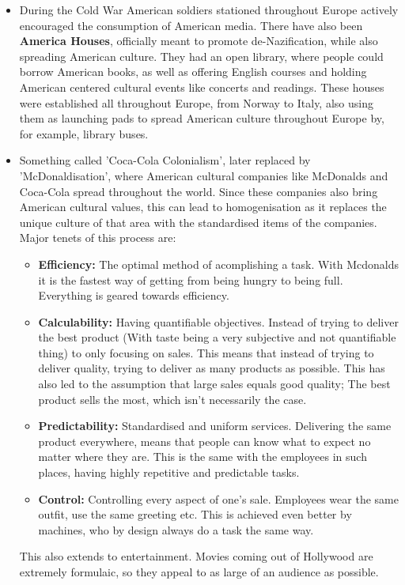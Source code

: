\documentclass{article}
\begin{document}
	\begin{itemize}
		\item{During the Cold War American soldiers stationed throughout Europe actively encouraged the consumption of American media. There have also been \textbf{America Houses}, officially meant to promote de-Nazification, while also spreading American culture. They had an open library, where people could borrow American books, as well as offering English courses and holding American centered cultural events like concerts and readings. These houses were established all throughout Europe, from Norway to Italy, also using them as launching pads to spread American culture throughout Europe by, for example, library buses.}
		\item{Something called 'Coca-Cola Colonialism', later replaced by 'McDonaldisation', where American cultural companies like McDonalds and Coca-Cola spread throughout the world. Since these companies also bring American cultural values, this can lead to homogenisation as it replaces the unique culture of that area with the standardised items of the companies. Major tenets of this process are:
		\begin{itemize}
			\item{\textbf{Efficiency:} The optimal method of acomplishing a task. With Mcdonalds it is the fastest way of getting from being hungry to being full. Everything is geared towards efficiency.}
			\item{\textbf{Calculability:} Having quantifiable objectives. Instead of trying to deliver the best product (With taste being a very subjective and not quantifiable thing) to only focusing on sales. This means that instead of trying to deliver quality, trying to deliver as many products as possible. This has also led to the assumption that large sales equals good quality; The best product sells the most, which isn't necessarily the case.}
		 	\item{\textbf{Predictability:} Standardised and uniform services. Delivering the same product everywhere, means that people can know what to expect no matter where they are. This is the same with the employees in such places, having highly repetitive and predictable tasks.}
		 	\item{\textbf{Control:} Controlling every aspect of one's sale. Employees wear the same outfit, use the same greeting etc. This is achieved even better by machines, who by design always do a task the same way.}
		 \end{itemize}}	
		 This also extends to entertainment. Movies coming out of Hollywood are extremely formulaic, so they appeal to as large of an audience as possible.
	\end{itemize}
\end{document}

